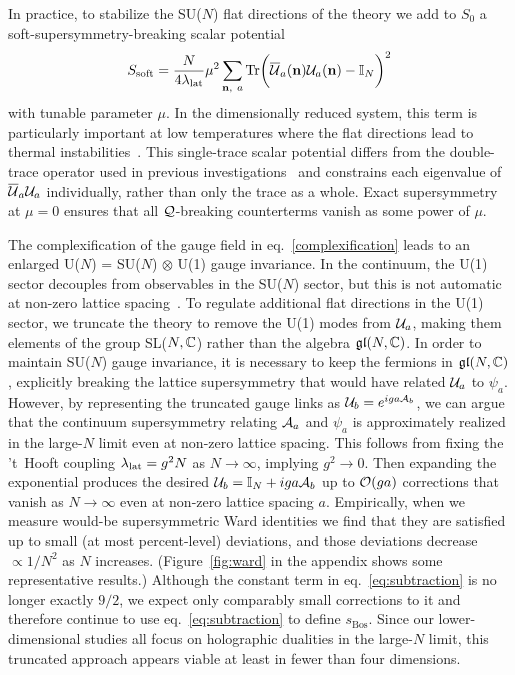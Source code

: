 In practice, to stabilize the SU($N$) flat directions of the theory we add to $S_0$ a soft-supersymmetry-breaking scalar potential
\begin{equation}
  \label{eq:single_trace}
  S_{\text{soft}} = \frac{N}{4\lambda_{\text{lat}}} \mu^2 \sum_{\mathbf{n},\ a} \mathrm{Tr}{\bigg(\overline{\mathcal U}_a(\mathbf{n}) \mathcal U_a(\mathbf{n}) - \mathbb I_N\bigg)^2}
\end{equation}
with tunable parameter $\mu$.
In the dimensionally reduced system, this term is particularly important at low temperatures where the flat directions lead to thermal instabilities~\cite{Catterall:2009xn}.
This single-trace scalar potential differs from the double-trace operator used in previous investigations~\cite{Catterall:2014vka, Schaich:2014pda, Catterall:2014vga} and 
constrains each eigenvalue of $\overline{\mathcal U}_a \mathcal U_a$ individually, rather than only the trace as a whole.
Exact supersymmetry at $\mu = 0$ ensures that all $\mathcal Q$-breaking counterterms vanish as some power of $\mu$.

The complexification of the gauge field in eq.~\eqref{complexification} leads to an enlarged U($N$) = SU($N$) $\otimes$ U(1) gauge invariance.
In the continuum, the U(1) sector decouples from observables in the SU($N$) sector, but this is not automatic at non-zero lattice spacing~\cite{Catterall:2014vka, Schaich:2014pda, Catterall:2014vga}.
To regulate additional flat directions in the U(1) sector, we truncate the theory to remove the U(1) modes from $\mathcal U_a$, making them elements of the group SL($N, \mathbb C$) rather than the algebra $\mathfrak{gl}(N, \mathbb C)$.
In order to maintain SU($N$) gauge invariance, it is necessary to keep the fermions in $\mathfrak{gl}(N, \mathbb C)$, explicitly breaking the lattice supersymmetry that would have related $\mathcal U_a$ to $\psi_a$.
However, by representing the truncated gauge links as $\mathcal U_b = e^{iga \mathcal A_b}$, we can argue that the continuum supersymmetry relating $\mathcal A_a$ and $\psi_a$ is approximately realized in the large-$N$ limit even at non-zero lattice spacing.
This follows from fixing the 't~Hooft coupling $\lambda_{\text{lat}} = g^2 N$ as $N \to \infty$, implying $g^2 \to 0$.
Then expanding the exponential produces the desired $\mathcal U_b = \mathbb I_N + iga\mathcal A_b$ up to $\mathcal O(ga)$ corrections that vanish as $N \to \infty$ even at non-zero lattice spacing $a$.
Empirically, when we measure would-be supersymmetric Ward identities we find that they are satisfied up to small (at most percent-level) deviations, and those deviations decrease $\propto 1 / N^2$ as $N$ increases.
(Figure~\ref{fig:ward} in the appendix shows some representative results.)
Although the constant term in eq.~\eqref{eq:subtraction} is no longer exactly $9 / 2$, we expect only comparably small corrections to it and therefore continue to use eq.~\eqref{eq:subtraction} to define $s_{\text{Bos}}$.
Since our lower-dimensional studies all focus on holographic dualities in the large-$N$ limit, this truncated approach appears viable at least in fewer than four dimensions.

